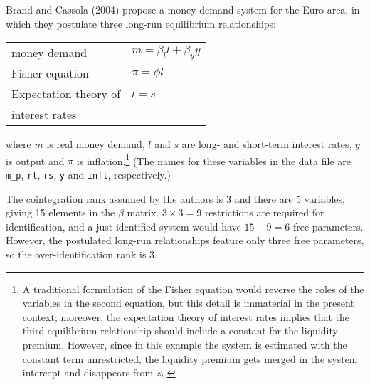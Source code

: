Brand and Cassola (2004) propose a money demand system for the Euro
area, in which they postulate three long-run equilibrium
relationships:
%
\begin{center}
\begin{tabular}{ll}
  money demand & $m = \beta_l l + \beta_y y$ \\
  Fisher equation & $\pi = \phi l$ \\
  Expectation theory of & $l = s$ \\ [-4pt]
  interest rates
\end{tabular}
\end{center}
%
where $m$ is real money demand, $l$ and $s$ are long- and short-term
interest rates, $y$ is output and $\pi$ is inflation.\footnote{A
  traditional formulation of the Fisher equation would reverse the
  roles of the variables in the second equation, but this detail is
  immaterial in the present context; moreover, the expectation theory
  of interest rates implies that the third equilibrium relationship
  should include a constant for the liquidity premium. However, since
  in this example the system is estimated with the constant term
  unrestricted, the liquidity premium gets merged in the system
  intercept and disappears from $z_t$.}  (The names for these
variables in the  data file are \verb|m_p|, \texttt{rl},
\texttt{rs}, \texttt{y} and \texttt{infl}, respectively.)

The cointegration rank assumed by the authors is 3 and there are 5
variables, giving 15 elements in the $\beta$ matrix.  $3 \times 3 = 9$
restrictions are required for identification, and a just-identified
system would have $15 - 9 = 6$ free parameters.  However, the
postulated long-run relationships feature only three free parameters,
so the over-identification rank is 3.

